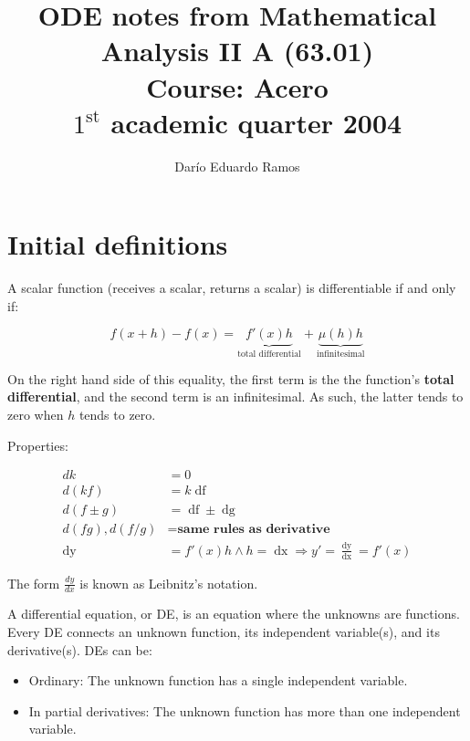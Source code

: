 \documentclass{article}
\title{ODE notes from Mathematical Analysis II A (63.01) \\ Course: Acero \\ $1^{\text{st}}$ academic quarter 2004}
\author{Darío Eduardo Ramos}
\begin{document}
\maketitle

\tableofcontents{}
\newpage

\section{Initial definitions}

A scalar function (receives a scalar, returns a scalar) is differentiable if and only if:

\begin{equation}
f(x+h) - f(x) = \underbrace{f'(x) h}_{\text{total differential}} + \underbrace{ \mu(h) h }_{\text{infinitesimal}}
\end{equation}

On the right hand side of this equality, the first term is the the function's \textbf{total differential}, and the second term is an infinitesimal. As such, the latter tends to zero when $h$ tends to zero.

Properties:

\begin{subequations}
\begin{align}
d k & = 0 \\
d(k f) & = k \mathop{df} \\
d(f \pm g) & = \mathop{df} \pm \mathop{dg} \\
d(f g), d( f / g ) & = \textbf{same rules as derivative} \\
\mathop{dy} & = f'(x) h \wedge h = \mathop{dx} \Longrightarrow y' = \frac{\mathop{dy}}{\mathop{dx}} = f'(x)
\end{align}
\end{subequations}

The form $\frac{dy}{dx}$ is known as Leibnitz's notation.

A differential equation, or DE, is an equation where the unknowns are functions. Every DE connects an unknown function, its independent variable(s), and its derivative(s). DEs can be:

\begin{itemize}
\item Ordinary: The unknown function has a single independent variable.
\item In partial derivatives: The unknown function has more than one independent variable.
\end{itemize}
\end{document}
